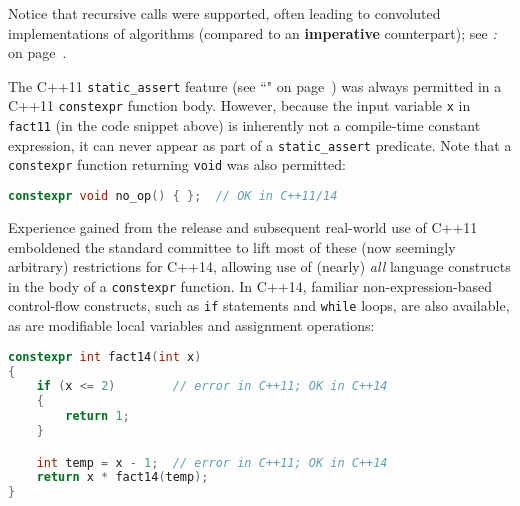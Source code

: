 \noindent Notice that recursive calls were supported, often leading to convoluted
implementations of algorithms (compared to an \textbf{imperative}
counterpart); see \textit{: } on page~\pageref{non-recursive-constexpr-algorithms}.

The C++11 \texttt{static\_assert} feature (see ``" on page~\pageref{compile-time-assertions-(static_assert)}) was always
permitted in a C++11 \texttt{constexpr} function body.
However, because the input variable \texttt{x} in \texttt{fact11}
(in the code snippet above) is inherently not a compile-time constant expression, it can
never appear as part of a \texttt{static\_assert} predicate. Note that a
\texttt{constexpr} function returning \texttt{void} was also permitted:

\begin{lstlisting}[language=C++]
constexpr void no_op() { };  // OK in C++11/14
\end{lstlisting}

\noindent Experience gained from the release and subsequent real-world use of
C++11 emboldened the standard committee to lift most of these (now
seemingly arbitrary) restrictions for C++14, allowing use of (nearly)
\emph{all} language constructs in the body of a \texttt{constexpr}
function. In C++14, familiar non-expression-based control-flow
constructs, such as \texttt{if} statements and \texttt{while} loops, are
also available, as are modifiable local variables and assignment
operations:

\begin{lstlisting}[language=C++]
constexpr int fact14(int x)
{
    if (x <= 2)        // error in C++11; OK in C++14
    {
        return 1;
    }

    int temp = x - 1;  // error in C++11; OK in C++14
    return x * fact14(temp);
}
\end{lstlisting}

